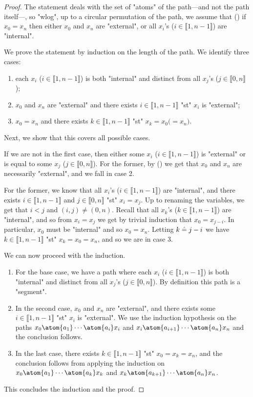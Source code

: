 \begin{proof}
	The statement deals with the set of "atoms" of the path---and not the path itself---,
	so "wlog", up to a circular permutation of the path, we assume that ()
	if $x_0 = x_n$
	then either $x_0$ and $x_n$ are "external", or all $x_i$'s ($i \in \lBrack 1,n-1\rBrack$)
	are "internal".

	We prove the statement by induction on the length of the path.
	We identify three cases:
	\begin{enumerate}
		\item each $x_i$ ($i \in \lBrack 1,n-1 \rBrack$) is both
			"internal" and distinct from all $x_j$'s ($j\in \lBrack 0,n\rBrack$);
		\item $x_0$ and $x_n$ are "external" and there exists
			$i \in \lBrack 1,n-1 \rBrack$ "st" $x_i$ is "external";
		\item $x_0 = x_n$ and there exists $k \in \lBrack 1,n-1 \rBrack$
					"st" $x_k = x_0 \mathrel{(=} x_n)$.
	\end{enumerate}
	Next, we show that this covers all possible cases.

	If we are not in the first case, then either some
	$x_i$ ($i \in \lBrack 1,n-1 \rBrack$) is "external" or is equal to some $x_j$ ($j\in \lBrack 0,n\rBrack$). For the former, by () we get that $x_0$ and $x_n$ are necessarily
	"external", and we fall in case 2.
	
	For the former, we know that all $x_i$'s 
	($i \in \lBrack 1,n-1 \rBrack$) are "internal", and there exists $i \in \lBrack 1,n-1 \rBrack$
	and $j\in \lBrack 0,n\rBrack$ "st" $x_i = x_j$. Up to renaming the variables, we get 
	that $i<j$ and $(i,j) \neq (0,n)$. 
	Recall that all $x_k$'s ($k \in \lBrack 1,n-1 \rBrack$) are "internal",
	and so from $x_i = x_j$ we get by trivial induction that $x_0 = x_{j-i}$.
	In particular, $x_0$ must be "internal" and so $x_0 = x_n$.
	Letting $k \mathrel{\hat{=}} j-i$ we have $k \in \lBrack 1,n-1 \rBrack$ "st" 
	$x_k = x_0 = x_n$, and so we are in case 3.

	We can now proceed with the induction.
	\begin{enumerate}
		\item For the base case, we have a path where each $x_i$ ($i \in \lBrack 1,n-1 \rBrack$)
			is both "internal" and distinct from all $x_j$'s ($j\in \lBrack 0,n\rBrack$).
			By definition this path is a "segment".
		\item In the second case, $x_0$ and $x_n$ are "external", and there exists
			some $i \in \lBrack 1,n-1 \rBrack$
			"st" $x_i$ is "external". We use the induction hypothesis on the paths
			$x_0 \atom{a_1} \cdots \atom{a_i} x_i$ and $x_i \atom{a_{i+1}} \cdots \atom{a_n} x_n$
			and the conclusion follows.
		\item In the last case, there exists $k \in \lBrack 1,n-1 \rBrack$
				"st" $x_0 = x_k = x_n$, and the conclusion follows from applying the
				induction on $x_0 \atom{a_1} \cdots \atom{a_k} x_k$ and
				$x_k \atom{a_{k+1}} \cdots \atom{a_n} x_n$.
	\end{enumerate}
	This concludes the induction and the proof.
\end{proof}

